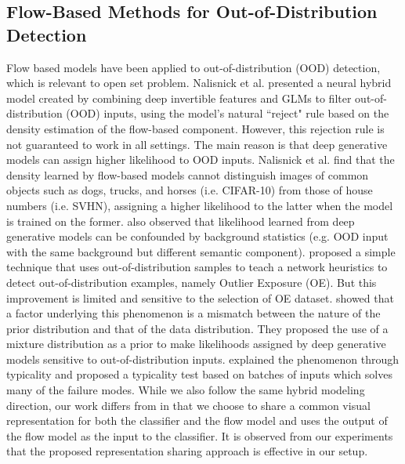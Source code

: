 \documentclass[runningheads]{llncs}
\begin{document}
\subsection{Flow-Based Methods for Out-of-Distribution Detection}
Flow based models have been applied to 
out-of-distribution (OOD) detection, which is relevant to open set problem. Nalisnick et al. \cite{nalisnick2019hybrid} presented a neural hybrid model created by combining deep invertible features and GLMs to filter out-of-distribution (OOD) inputs, using the model's natural ``reject" rule based on the density estimation of the flow-based component. However, this rejection rule is not guaranteed to work in all settings. The main reason is that deep generative models can assign higher likelihood to OOD inputs. Nalisnick et al. \cite{nalisnick2018deep} find that the density learned by flow-based models cannot distinguish images of common objects such as dogs, trucks, and horses (i.e. CIFAR-10) from those of house numbers (i.e. SVHN), assigning a higher likelihood to the latter when the model is trained on the former. \cite{ren2019likelihood} also observed that likelihood learned from deep generative models can be confounded by background statistics (e.g. OOD input with the same background but different semantic component). \cite{hendrycks2018deep} 
proposed a simple technique that uses out-of-distribution samples to teach a network heuristics to detect out-of-distribution examples, namely Outlier Exposure (OE). But this improvement is limited and sensitive to the selection of OE dataset.
\cite{kamoi2019likelihood} showed that a factor underlying this phenomenon is a mismatch between the nature of the prior distribution and that of the data distribution. They proposed the use of a mixture distribution as a prior to make likelihoods assigned by deep generative models sensitive to out-of-distribution inputs. \cite{nalisnick2019detecting} explained the phenomenon through typicality and proposed a typicality test based on batches of inputs which solves many of the failure modes.
While we also follow the same hybrid modeling direction, our work differs from \cite{nalisnick2019hybrid} in that we choose to share a common visual representation for both the classifier and the flow model and \cite{nalisnick2019hybrid} uses the output of the flow model as the input to the classifier. It is observed from our experiments that the proposed representation sharing approach is effective in our setup.
\end{document}
